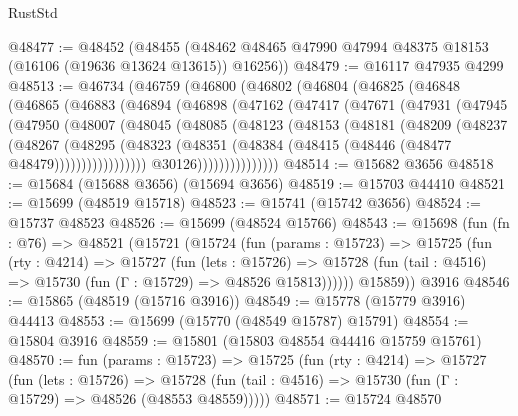 \begin{lexlean}{RustStd}
\begin{coremodule}
@48477 := @48452
    (@48455 (@48462 @48465 @47990 @47994 @48375 @18153 (@16106 (@19636 @13624 @13615)) @16256))
@48479 := @16117 @47935 @4299
@48513 := @46734
    (@46759
      (@46800
        (@46802
          (@46804
            (@46825
              (@46848
                (@46865
                  (@46883
                    (@46894
                      (@46898
                        (@47162
                          (@47417
                            (@47671
                              (@47931
                                (@47945
                                  (@47950
                                    (@48007
                                      (@48045
                                        (@48085
                                          (@48123
                                            (@48153
                                              (@48181
                                                (@48209
                                                  (@48237
                                                    (@48267
                                                      (@48295
                                                        (@48323
                                                          (@48351
                                                            (@48384
                                                              (@48415
                                                                (@48446
                                                                  (@48477 @48479)))))))))))))))))
                                  @30126)))))))))))))))
@48514 := @15682 @3656
@48518 := @15684 (@15688 @3656) (@15694 @3656)
@48519 := @15703 @44410
@48521 := @15699 (@48519 @15718)
@48523 := @15741 (@15742 @3656)
@48524 := @15737 @48523
@48526 := @15699 (@48524 @15766)
@48543 := @15698
    (fun (fn : @76) =>
    @48521
      (@15721
        (@15724
          (fun (params : @15723) =>
          @15725
            (fun (rty : @4214) =>
            @15727
              (fun (lets : @15726) =>
              @15728 (fun (tail : @4516) => @15730 (fun (Γ : @15729) => @48526 @15813))))))
        @15859))
    @3916
@48546 := @15865 (@48519 (@15716 @3916))
@48549 := @15778 (@15779 @3916) @44413
@48553 := @15699 (@15770 (@48549 @15787) @15791)
@48554 := @15804 @3916
@48559 := @15801 (@15803 @48554 @44416 @15759 @15761)
@48570 := fun (params : @15723) =>
  @15725
    (fun (rty : @4214) =>
    @15727
      (fun (lets : @15726) =>
      @15728 (fun (tail : @4516) => @15730 (fun (Γ : @15729) => @48526 (@48553 @48559)))))
@48571 := @15724 @48570

\end{coremodule}
\end{lexlean}
